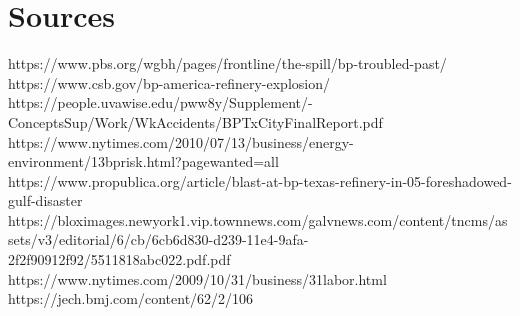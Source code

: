\documentclass[12pt]{article}
\begin{document}
	\section*{Sources}
	https://www.pbs.org/wgbh/pages/frontline/the-spill/bp-troubled-past/
	https://www.csb.gov/bp-america-refinery-explosion/
	https://people.uvawise.edu/pww8y/Supplement/-ConceptsSup/Work/WkAccidents/BPTxCityFinalReport.pdf
	https://www.nytimes.com/2010/07/13/business/energy-environment/13bprisk.html?pagewanted=all
	https://www.propublica.org/article/blast-at-bp-texas-refinery-in-05-foreshadowed-gulf-disaster
	https://bloximages.newyork1.vip.townnews.com/galvnews.com/content/tncms/assets/v3/editorial/6/cb/6cb6d830-d239-11e4-9afa-2f2f90912f92/5511818abc022.pdf.pdf
	https://www.nytimes.com/2009/10/31/business/31labor.html
	https://jech.bmj.com/content/62/2/106
\end{document}
